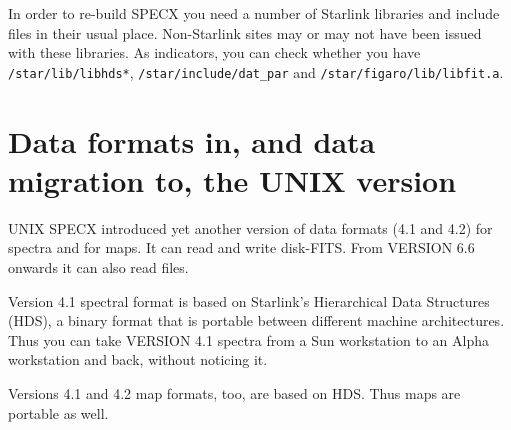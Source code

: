 \documentclass[twoside,11pt,nolof]{starlink}
\begin{document}
In order to re-build SPECX you need a number of Starlink libraries and
include files in their usual place. Non-Starlink sites may or may not
have been issued with these libraries. As indicators, you can check
whether you have \texttt{/star/lib/libhds*}, \texttt{/star/include/dat\_par}
and \texttt{/star/figaro/lib/libfit.a}.


\section{Data
formats in, and data migration to, the UNIX version}

UNIX SPECX introduced yet another version of data formats (4.1 and 4.2) for
spectra and for maps. It can read and write disk-FITS. From VERSION 6.6
onwards it can also read  files.

Version 4.1 spectral format is based on Starlink's Hierarchical Data
Structures (HDS), a binary format that is portable between different
machine architectures. Thus you can take VERSION 4.1 spectra from a Sun
workstation to an Alpha workstation and back, without noticing it.

Versions 4.1 and 4.2 map formats, too, are based on HDS. Thus maps are
portable as well.
\end{document}
